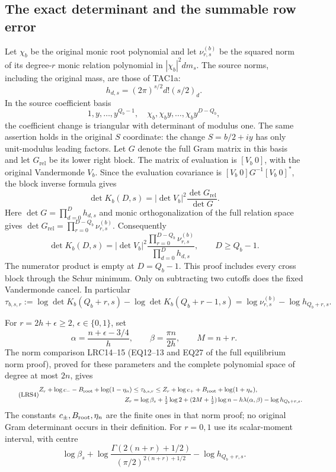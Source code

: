\subsection{The exact determinant and the summable row error}

Let $\chi_b$ be the original monic root polynomial and let
$\nu_{r,s}^{(b)}$ be the squared norm of its degree-$r$ monic relation
polynomial in $|\chi_b|^2dm_s$.  The source norms, including the
original mass, are those of TAC1a:
\[
 h_{d,s}=(2\pi)^{s/2}d!(s/2)_d.
\]
In the source coefficient basis
\[
 1,y,\ldots,y^{Q_b-1},\quad
 \chi_b,\chi_by,\ldots,\chi_by^{D-Q_b},
\]
the coefficient change is triangular with determinant of modulus one.
The same assertion holds in the original $S$ coordinate: the change
$S=b/2+iy$ has only unit-modulus leading factors.  Let $G$ denote the
full Gram matrix in this basis and let $G_{\mathrm{rel}}$ be its lower
right block.  The matrix of evaluation is $[V_b\ 0]$, with the
original Vandermonde $V_b$.  Since the evaluation covariance is
$[V_b\ 0]G^{-1}[V_b\ 0]^*$, the block inverse formula gives
\[
 \det K_b(D,s)=|\det V_b|^2\frac{\det G_{\mathrm{rel}}}{\det G}.
\]
Here $\det G=\prod_{d=0}^Dh_{d,s}$ and monic orthogonalization of
the full relation space gives
$\det G_{\mathrm{rel}}=\prod_{r=0}^{D-Q_b}\nu_{r,s}^{(b)}$.
Consequently
\begin{equation}\tag{LRS2}
 \det K_b(D,s)=|\det V_b|^2
 \frac{\prod_{r=0}^{D-Q_b}\nu_{r,s}^{(b)}}
      {\prod_{d=0}^{D}h_{d,s}},\qquad D\ge Q_b-1.
\end{equation}
The numerator product is empty at $D=Q_b-1$.  This proof includes
every cross block through the Schur minimum.  Only on subtracting
two cutoffs does the fixed Vandermonde cancel.  In particular
\begin{equation}\tag{LRS3}
 \tau_{b,s,r}:=\log\det K_b(Q_b+r,s)
              -\log\det K_b(Q_b+r-1,s)
     =\log\nu_{r,s}^{(b)}-\log h_{Q_b+r,s}.
\end{equation}

For $r=2h+\epsilon\ge2$, $\epsilon\in\{0,1\}$, set
\[
 \alpha=\frac{n+\epsilon-3/4}{h},\qquad
 \beta=\frac{\pi n}{2h},\qquad M=n+r.
\]
The norm comparison LRC14--15 (EQ12--13 and EQ27 of the full equilibrium
norm proof), proved for these parameters and the
complete polynomial space of degree at most $2n$, gives
\begin{equation}\tag{LRS4}
\begin{split}
 Z_r+\log c_- -B_{\rm root}+\log(1-\eta_n)
   &\le\tau_{b,s,r}\le
 Z_r+\log c_+ +B_{\rm root}+\log(1+\eta_n),\\
 Z_r&=\log\beta_s+\tfrac12\log2
       +(2M+\tfrac12)\log n-h\lambda(\alpha,\beta)
       -\log h_{Q_b+r,s}.
\end{split}
\end{equation}
The constants $c_\pm,B_{\rm root},\eta_n$ are the finite ones in that
norm proof; no original Gram determinant occurs in their definition.
For $r=0,1$ use its scalar-moment interval, with centre
\[
 \log\beta_s+\log\frac{\Gamma(2(n+r)+1/2)}
                              {(\pi/2)^{2(n+r)+1/2}}
                       -\log h_{Q_b+r,s}.
\]

